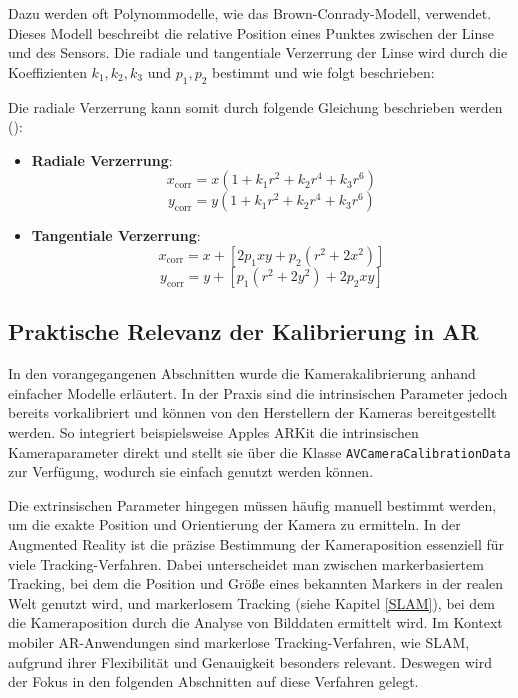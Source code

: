 Dazu werden oft Polynommodelle, wie das Brown-Conrady-Modell, verwendet. Dieses Modell beschreibt die relative Position eines Punktes zwischen der Linse und des Sensors. Die radiale und tangentiale Verzerrung der Linse wird durch die Koeffizienten \( k_1, k_2, k_3 \) und \( p_1, p_2 \) bestimmt \cite{brown1966distortion} und wie folgt beschrieben:

Die radiale Verzerrung kann somit durch folgende Gleichung beschrieben werden (\cite{mw2024calibration, szeliski2022computerVision}):
\begin{itemize}
    \item \textbf{Radiale Verzerrung}:
    \[ x_{\text{corr}} = x \left( 1 + k_1 r^2 + k_2 r^4 + k_3 r^6 \right) \]
    \[ y_{\text{corr}} = y \left( 1 + k_1 r^2 + k_2 r^4 + k_3 r^6 \right) \]
    \item \textbf{Tangentiale Verzerrung}:
    \[ x_{\text{corr}} = x + [2p_1xy + p_2(r^2 + 2x^2)] \]
    \[ y_{\text{corr}} = y + [p_1(r^2 + 2y^2) + 2p_2xy] \]
\end{itemize}

\subsection{Praktische Relevanz der Kalibrierung in AR}

In den vorangegangenen Abschnitten wurde die Kamerakalibrierung anhand einfacher Modelle erläutert. In der Praxis sind die intrinsischen Parameter jedoch bereits vorkalibriert und können von den Herstellern der Kameras bereitgestellt werden. So integriert beispielsweise Apples ARKit die intrinsischen Kameraparameter direkt und stellt sie über die Klasse \texttt{AVCameraCalibrationData} zur Verfügung, wodurch sie einfach genutzt werden können. \cite{appledevdoc}

Die extrinsischen Parameter hingegen müssen häufig manuell bestimmt werden, um die exakte Position und Orientierung der Kamera zu ermitteln. In der Augmented Reality ist die präzise Bestimmung der Kameraposition essenziell für viele Tracking-Verfahren. Dabei unterscheidet man zwischen markerbasiertem Tracking, bei dem die Position und Größe eines bekannten Markers in der realen Welt genutzt wird, und markerlosem Tracking (siehe Kapitel \ref{SLAM}), bei dem die Kameraposition durch die Analyse von Bilddaten ermittelt wird. Im Kontext mobiler AR-Anwendungen sind markerlose Tracking-Verfahren, wie SLAM, aufgrund ihrer Flexibilität und Genauigkeit besonders relevant. Deswegen wird der Fokus in den folgenden Abschnitten auf diese Verfahren gelegt. \cite{doerner2022virtual, alam2024calibration}

